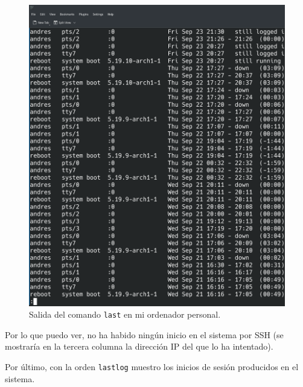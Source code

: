 \documentclass{article}
\begin{document}
\begin{figure}[H]
    \includegraphics[width=\textwidth]{imagenes/lastcasa.png}
    \caption{Salida del comando \texttt{last} en mi ordenador personal.}    
\end{figure}

Por lo que puedo ver, no ha habido ningún inicio en el sistema por SSH (se mostraría en la tercera columna la dirección IP del que lo ha intentado).

\newpage

Por último, con la orden \verb|lastlog| muestro los inicios de sesión producidos en el sistema.
\end{document}
